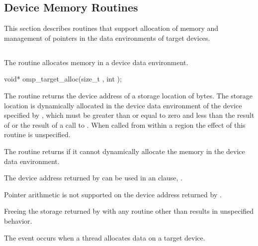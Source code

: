 \vspace{3\baselineskip}
\begin{ccppspecific}
\vspace{-3\baselineskip}
\section{Device Memory Routines}
\label{sec:Device Memory Routines}
This section describes routines that support allocation of memory and
management of pointers in the data environments of target devices.


\subsection{}
\label{subsec:omp_target_alloc}
\summary
The  routine allocates memory in a device data
environment.

\format
\begin{ompcFunction}
void* omp_target_alloc(size_t , int );
\end{ompcFunction}

\effect

The  routine returns the device address of a storage
location of  bytes. The storage location is dynamically allocated in
the device data environment of the device specified by , which
must be greater than or equal to zero and less than the result of
 or the result of a call to
. When called from within a  region
the effect of this routine is unspecified.

The  routine returns  if it cannot dynamically
allocate the memory in the device data environment.

The device address returned by  can be used in an
 clause, .

Pointer arithmetic is not supported on the device address returned by
.

Freeing the storage returned by  with any routine
other than  results in unspecified behavior.

\events
The  event occurs when a thread allocates data on a target device.


\end{ccppspecific}
